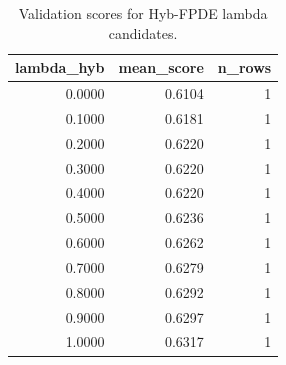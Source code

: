 \begin{table}[t]
\caption{Validation scores for Hyb-FPDE lambda candidates.}
\label{tab:lambda_distribution_computed}
\centering
\begin{tabular}{rrr}
\toprule
lambda\_hyb & mean\_score & n\_rows \\
\midrule
0.0000 & 0.6104 & 1 \\
0.1000 & 0.6181 & 1 \\
0.2000 & 0.6220 & 1 \\
0.3000 & 0.6220 & 1 \\
0.4000 & 0.6220 & 1 \\
0.5000 & 0.6236 & 1 \\
0.6000 & 0.6262 & 1 \\
0.7000 & 0.6279 & 1 \\
0.8000 & 0.6292 & 1 \\
0.9000 & 0.6297 & 1 \\
1.0000 & 0.6317 & 1 \\
\bottomrule
\end{tabular}

\end{table}
